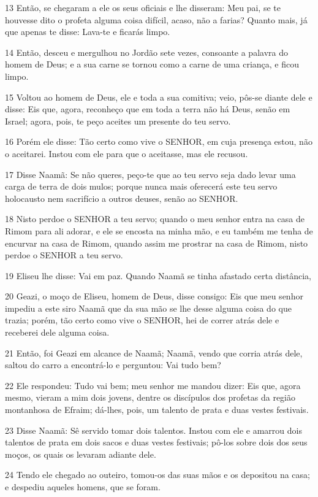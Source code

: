 \par 13 Então, se chegaram a ele os seus oficiais e lhe disseram: Meu pai, se te houvesse dito o profeta alguma coisa difícil, acaso, não a farias? Quanto mais, já que apenas te disse: Lava-te e ficarás limpo.
\par 14 Então, desceu e mergulhou no Jordão sete vezes, consoante a palavra do homem de Deus; e a sua carne se tornou como a carne de uma criança, e ficou limpo.
\par 15 Voltou ao homem de Deus, ele e toda a sua comitiva; veio, pôs-se diante dele e disse: Eis que, agora, reconheço que em toda a terra não há Deus, senão em Israel; agora, pois, te peço aceites um presente do teu servo.
\par 16 Porém ele disse: Tão certo como vive o SENHOR, em cuja presença estou, não o aceitarei. Instou com ele para que o aceitasse, mas ele recusou.
\par 17 Disse Naamã: Se não queres, peço-te que ao teu servo seja dado levar uma carga de terra de dois mulos; porque nunca mais oferecerá este teu servo holocausto nem sacrifício a outros deuses, senão ao SENHOR.
\par 18 Nisto perdoe o SENHOR a teu servo; quando o meu senhor entra na casa de Rimom para ali adorar, e ele se encosta na minha mão, e eu também me tenha de encurvar na casa de Rimom, quando assim me prostrar na casa de Rimom, nisto perdoe o SENHOR a teu servo.
\par 19 Eliseu lhe disse: Vai em paz. Quando Naamã se tinha afastado certa distância,
\par 20 Geazi, o moço de Eliseu, homem de Deus, disse consigo: Eis que meu senhor impediu a este siro Naamã que da sua mão se lhe desse alguma coisa do que trazia; porém, tão certo como vive o SENHOR, hei de correr atrás dele e receberei dele alguma coisa.
\par 21 Então, foi Geazi em alcance de Naamã; Naamã, vendo que corria atrás dele, saltou do carro a encontrá-lo e perguntou: Vai tudo bem?
\par 22 Ele respondeu: Tudo vai bem; meu senhor me mandou dizer: Eis que, agora mesmo, vieram a mim dois jovens, dentre os discípulos dos profetas da região montanhosa de Efraim; dá-lhes, pois, um talento de prata e duas vestes festivais.
\par 23 Disse Naamã: Sê servido tomar dois talentos. Instou com ele e amarrou dois talentos de prata em dois sacos e duas vestes festivais; pô-los sobre dois dos seus moços, os quais os levaram adiante dele.
\par 24 Tendo ele chegado ao outeiro, tomou-os das suas mãos e os depositou na casa; e despediu aqueles homens, que se foram.

